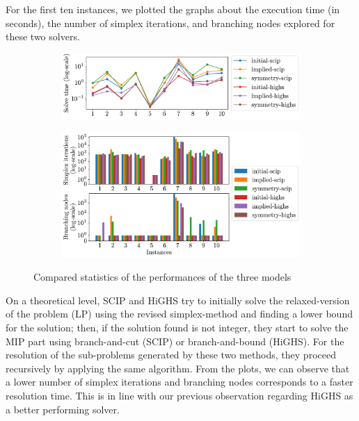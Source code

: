 For the first ten instances, we plotted the graphs about the execution time (in seconds), the number of simplex iterations, and branching nodes explored for these two solvers.
\begin{figure}[H]
    \centering
    \begin{subfigure}{0.8\linewidth}
        \centering
        \includegraphics[width=\linewidth]{img/mip/time.pdf}
    \end{subfigure}
    \begin{subfigure}{0.8\linewidth}
        \centering
        \includegraphics[width=\linewidth]{img/mip/simplex.pdf}
\end{subfigure}
    \caption{Compared statistics of the performances of the three models}
\end{figure}



On a theoretical level, SCIP and HiGHS try to initially solve the relaxed-version of the problem (LP) using the revised simplex-method and finding a lower bound for the solution; then, if the solution found is not integer, they start to solve the MIP part using branch-and-cut (SCIP) or branch-and-bound (HiGHS). For the resolution of the sub-problems generated by these two methods, they proceed recursively by applying the same algorithm.
From the plots, we can observe that a lower number of simplex iterations and branching nodes corresponds to a faster resolution time. This is in line with our previous observation regarding HiGHS as a better performing solver.
